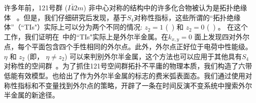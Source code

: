 许多年前，121号群 ($I\bar 42m$) 非中心对称的结构中的许多化合物被认为是拓扑绝缘体 ~\citep{Wang2010}。但是，我们仔细研究后发现，基于$S_4$对称性指标，这些所谓的“拓扑绝缘体”（``TIs"）实际上可以分为两个不同的情况: $z_2=1$ (\tii~) 和 $z_2=0$ (\wsm~) 。
在这个工作，我们证明在\wsm~中的``TIs"实际上是外尔半金属。在$k_{x,y}=0$ 面上发现四对外尔点，每个平面包含四个手性相同的外尔点。此外，外尔点正好位于电荷中性能级。$\eta$ 和 $z_2$  (即， $\eta\neq z_2$) 可以来判别外尔半金属，这个方法也可以应用于其他具有$S_4$对称性的空间群~\citep{Haijun2016,HgTenc2016}。为了抓住121号空间群拓扑不平庸的物理本质，我们构造了六带低能有效模型。也给出了作为外尔半金属的标志的费米弧表面态。我们通过使用对称性指标和不变量找到外尔点的策略，开辟了一条在时间反演不变系统中搜索外尔半金属的新途径。









